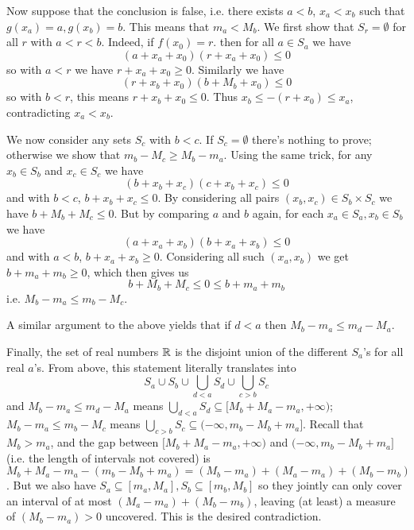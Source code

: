 \documentclass[11pt,a4paper]{article}
\begin{document}
\begin{enumerate}
	Now suppose that the conclusion is false, i.e. there exists $a < b$, $x_a < x_b$ such that $g(x_a)=a, g(x_b)=b$. 
	This means that $m_a < M_b$. 
	We first show that $S_r=\emptyset$ for all $r$ with $a < r < b$. 
	Indeed, if $f(x_0)=r$. then for all $a\in S_a$ we have 
	\begin{equation}
		(a+x_a+x_0)(r + x_a + x_0)\le 0
	\end{equation}
	so with $a < r$ we have 
	$r + x_a + x_0\ge 0$. 
	Similarly we have 
	\begin{equation}
		(r + x_b + x_0)(b + M_b + x_0)\le 0
	\end{equation}
    so with $b < r$, this means 
	$r + x_b + x_0\le 0$. 
	Thus 
	$x_b\le -(r + x_0)\le x_a$, contradicting $x_a < x_b$. 
	
	We now consider any sets $S_c$ with $b < c$. 
	If $S_c=\emptyset$ there's nothing to prove; otherwise we show that $m_b-M_c\ge M_b - m_a$. 
	Using the same trick, for any $x_b\in S_b$ and $x_c\in S_c$ we have 
	\begin{equation}
		(b + x_b + x_c)(c+x_b+x_c)\le 0
	\end{equation}
    and with $b < c$, $b + x_b + x_c \le 0$. By considering all pairs $(x_b, x_c)\in S_b\times S_c$ we have 
    $b + M_b + M_c \le 0$. 
    But by comparing $a$ and $b$ again, for each $x_a\in S_a, x_b\in S_b$ we have 
    \begin{equation}
    	(a + x_a + x_b)(b + x_a + x_b)\le 0
    \end{equation}
    and with $a < b$, $b + x_a + x_b\ge 0$. 
    Considering all such $(x_a, x_b)$ we get $b + m_a + m_b\ge 0$, which then gives us 
    \begin{equation}
    	b + M_b + M_c\le 0\le b + m_a + m_b
    \end{equation}
    i.e. $M_b - m_a \le m_b - M_c$. 
    
    A similar argument to the above yields that if $d < a$ then 
    $M_b - m_a \le m_d - M_a$. 
    
    Finally, the set of real numbers $\mathbb{R}$ is the disjoint union of the different $S_a$'s for all real $a$'s. 
    From above, this statement literally translates into 
    \begin{equation}
    	S_a\cup S_b \cup \bigcup_{d < a} S_d \cup \bigcup_{c > b} S_c
    \end{equation}
    and $M_b - m_a \le m_d - M_a$ means $\bigcup_{d < a} S_d\subseteq [M_b + M_a - m_a, +\infty)$; 
    $M_b - m_a\le m_b - M_c$ means $\bigcup_{c > b} S_c\subseteq (-\infty, m_b - M_b + m_a]$. 
    Recall that $M_b > m_a$, and the gap between $[M_b + M_a - m_a, +\infty)$ and $(-\infty, m_b - M_b + m_a]$ 
    (i.e. the length of intervals not covered) is 
    $M_b + M_a - m_a - ( m_b - M_b + m_a)
    =(M_b - m_a) + (M_a - m_a) + (M_b - m_b)$. 
    But we also have $S_a\subseteq [m_a, M_a], S_b\subseteq [m_b, M_b]$ so they jointly can only cover an interval of at most 
    $(M_a - m_a) + (M_b - m_b)$, 
    leaving (at least) a measure of $(M_b - m_a) > 0$ uncovered. 
    This is the desired contradiction. 
	
\end{enumerate}
\end{document}
